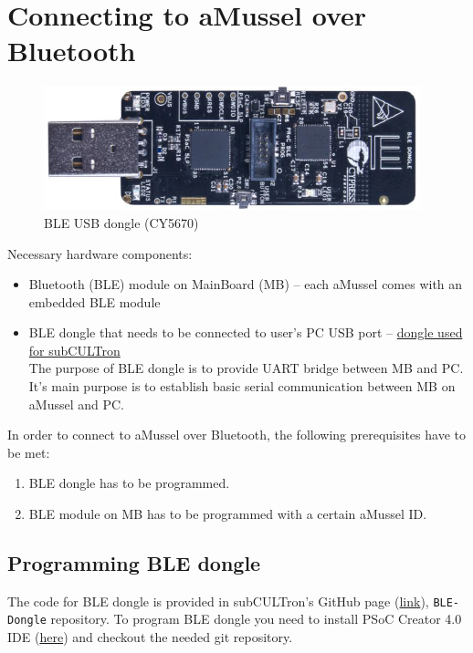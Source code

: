 \chapter{Connecting to aMussel over Bluetooth}
\label{ch:connecting_to_ble}

\begin{figure}[htb]
    \centering
	  \includegraphics[width=0.5\linewidth]{figures/USB_Dongle.png}
	\caption{BLE USB dongle (CY5670)}
	\label{fig:ble_hardware}
\end{figure}

Necessary hardware components:
\begin{itemize}
	\item Bluetooth (BLE) module on MainBoard (MB) -- each aMussel comes with an embedded BLE module
	\item BLE dongle that needs to be connected to user's PC USB port -- \href{http://www.cypress.com/documentation/development-kitsboards/cy5670-cysmart-usb-dongle}{dongle used for subCULTron} \\
	The purpose of BLE dongle is to provide UART bridge between MB and PC. It's main purpose is to establish basic serial communication between MB on aMussel and PC.
\end{itemize}

In order to connect to aMussel over Bluetooth, the following prerequisites have to be met:
\begin{enumerate}
	\item BLE dongle has to be programmed.
	\item BLE module on MB has to be programmed with a certain aMussel ID.
\end{enumerate}

\section{Programming BLE dongle}

The code for BLE dongle is provided in subCULTron's GitHub page (\href{https://github.com/subCULTron-project}{link}), \texttt{BLE-Dongle} repository. To program BLE dongle you need to install PSoC Creator 4.0 IDE (\href{http://www.cypress.com/documentation/software-and-drivers/psoc-creator-software-archive}{here}) and checkout the needed git repository.

